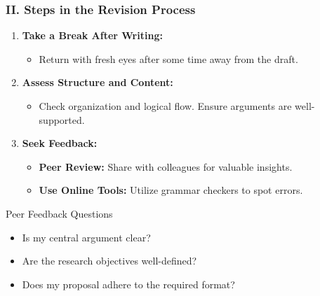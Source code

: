 \documentclass[aspectratio=169]{beamer}
\begin{document}
\begin{frame}[fragile]
    \frametitle{II. Steps in the Revision Process}
    \begin{enumerate}
        \item \textbf{Take a Break After Writing:}
        \begin{itemize}
            \item Return with fresh eyes after some time away from the draft.
        \end{itemize}

        \item \textbf{Assess Structure and Content:}
        \begin{itemize}
            \item Check organization and logical flow. Ensure arguments are well-supported.
        \end{itemize}

        \item \textbf{Seek Feedback:}
        \begin{itemize}
            \item \textbf{Peer Review:} Share with colleagues for valuable insights.
            \item \textbf{Use Online Tools:} Utilize grammar checkers to spot errors.
        \end{itemize}
    \end{enumerate}
    \begin{block}{Peer Feedback Questions}
        \begin{itemize}
            \item Is my central argument clear?
            \item Are the research objectives well-defined?
            \item Does my proposal adhere to the required format?
        \end{itemize}
    \end{block}
\end{frame}
\end{document}
